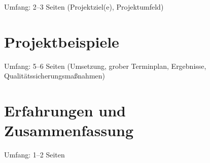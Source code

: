 \documentclass[type=internship,theme=default,language=german,titlelanguage=german,smartquotes=true,aiusage=detailed]{hgbthesis}
\begin{document}
Umfang: 2--3 Seiten (Projektziel(e), Projektumfeld)

     
\chapter{Projektbeispiele}

Umfang: 5--6 Seiten (Umsetzung, grober Terminplan, Ergebnisse,
Qualitätssicherungsmaßnahmen)


\chapter{Erfahrungen und Zusammenfassung}

Umfang: 1--2 Seiten


\end{document}
